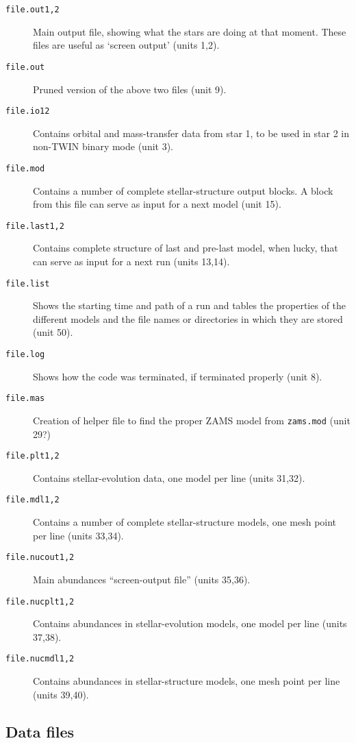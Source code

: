 \begin{description}
\item[\texttt{file.out1,2}] Main output file, showing what the stars are doing at that moment. These files are useful as `screen output' (units 1,2).
\item[\texttt{file.out}] Pruned version of the above two files (unit 9). 
\item[\texttt{file.io12}]\hypertarget{io12}{} Contains orbital and mass-transfer data from star 1, to be used in star 2 in non-TWIN binary mode (unit 3).
\item[\texttt{file.mod}] Contains a number of complete stellar-structure output blocks. A block from this file can serve as input for a next model (unit 15).
\item[\texttt{file.last1,2}] Contains complete structure of last and pre-last model, when lucky, that can serve as input for a next run (units 13,14).
\item[\texttt{file.list}] Shows the starting time and path of a run and tables the properties of the different models and the file names or directories in which they are stored (unit 50).
\item[\texttt{file.log}] Shows how the code was terminated, if terminated properly (unit 8).
\item[\texttt{file.mas}] Creation of helper file to find the proper ZAMS model from \texttt{zams.mod} (unit 29?)
\item[\texttt{file.plt1,2}] Contains stellar-evolution data, one model per line (units 31,32).
\item[\texttt{file.mdl1,2}] Contains a number of complete stellar-structure models, one mesh point per line (units 33,34).
\item[\texttt{file.nucout1,2}] Main abundances ``screen-output file''  (units 35,36).
\item[\texttt{file.nucplt1,2}] Contains abundances in stellar-evolution models, one model per line  (units 37,38).
\item[\texttt{file.nucmdl1,2}] Contains abundances in stellar-structure models, one mesh point per line  (units 39,40).
\end{description}


\subsection{Data files}

